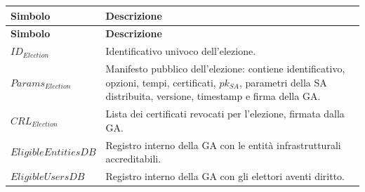 \documentclass[a4paper,12pt]{article}
\begin{document}
\begin{longtable}{|>{\raggedright\arraybackslash}p{}|>{\raggedright\arraybackslash}p{}|}
	\hline
	\rowcolor{HeaderBlue}\textbf{Simbolo} & \textbf{Descrizione}                                                                                                                                                     \\
	\hline
	\endfirsthead
	\hline
	\rowcolor{HeaderBlue}\textbf{Simbolo} & \textbf{Descrizione}                                                                                                                                                     \\
	\hline
	\endhead
	$ID_{Election}$                       & Identificativo univoco dell'elezione.                                                                                                                                    \\
	\hline
	$Params_{Election}$                   & Manifesto pubblico dell'elezione: contiene identificativo, opzioni, tempi, certificati, $pk_{SA}$, parametri della SA distribuita, versione, timestamp e firma della GA. \\
	\hline
	$CRL_{Election}$                      & Lista dei certificati revocati per l'elezione, firmata dalla GA.                                                                                                         \\
	\hline
	$EligibleEntitiesDB$                  & Registro interno della GA con le entità infrastrutturali accreditabili.                                                                                                  \\
	\hline
	$EligibleUsersDB$                     & Registro interno della GA con gli elettori aventi diritto.                                                                                                               \\
	\hline
    

\end{longtable}
\end{document}
